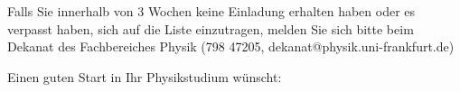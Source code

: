 Falls Sie innerhalb von 3 Wochen keine Einladung erhalten haben oder es verpasst haben, sich auf die Liste einzutragen, melden Sie sich bitte beim Dekanat des Fachbereiches Physik (798 47205, dekanat@physik.uni-frankfurt.de)

Einen guten Start in Ihr Physikstudium wünscht:

